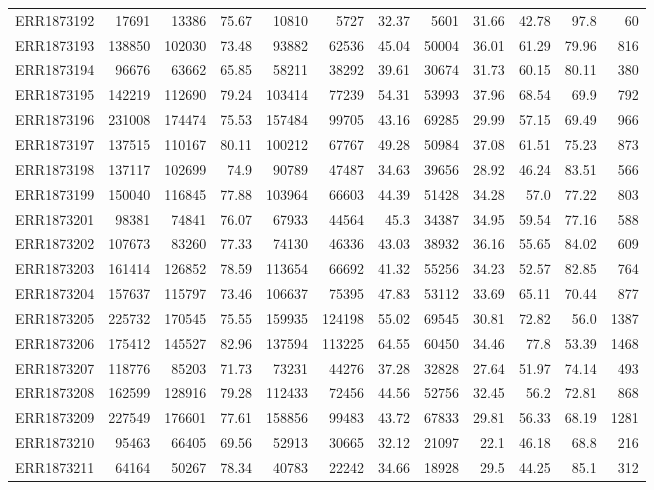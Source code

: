 \documentclass[12pt, oneside]{report}
\begin{document}
\begin{longtable}{@{}p{3.2cm}rrrrrrrrrrr@{}}
ERR1873192 & 17691 & 13386 & 75.67 & 10810 & 5727 & 32.37 & 5601 & 31.66 & 42.78 & 97.8 & 60 \\
ERR1873193 & 138850 & 102030 & 73.48 & 93882 & 62536 & 45.04 & 50004 & 36.01 & 61.29 & 79.96 & 816 \\
ERR1873194 & 96676 & 63662 & 65.85 & 58211 & 38292 & 39.61 & 30674 & 31.73 & 60.15 & 80.11 & 380 \\
ERR1873195 & 142219 & 112690 & 79.24 & 103414 & 77239 & 54.31 & 53993 & 37.96 & 68.54 & 69.9 & 792 \\
ERR1873196 & 231008 & 174474 & 75.53 & 157484 & 99705 & 43.16 & 69285 & 29.99 & 57.15 & 69.49 & 966 \\
ERR1873197 & 137515 & 110167 & 80.11 & 100212 & 67767 & 49.28 & 50984 & 37.08 & 61.51 & 75.23 & 873 \\
ERR1873198 & 137117 & 102699 & 74.9 & 90789 & 47487 & 34.63 & 39656 & 28.92 & 46.24 & 83.51 & 566 \\
ERR1873199 & 150040 & 116845 & 77.88 & 103964 & 66603 & 44.39 & 51428 & 34.28 & 57.0 & 77.22 & 803 \\
ERR1873201 & 98381 & 74841 & 76.07 & 67933 & 44564 & 45.3 & 34387 & 34.95 & 59.54 & 77.16 & 588 \\
ERR1873202 & 107673 & 83260 & 77.33 & 74130 & 46336 & 43.03 & 38932 & 36.16 & 55.65 & 84.02 & 609 \\
ERR1873203 & 161414 & 126852 & 78.59 & 113654 & 66692 & 41.32 & 55256 & 34.23 & 52.57 & 82.85 & 764 \\
ERR1873204 & 157637 & 115797 & 73.46 & 106637 & 75395 & 47.83 & 53112 & 33.69 & 65.11 & 70.44 & 877 \\
ERR1873205 & 225732 & 170545 & 75.55 & 159935 & 124198 & 55.02 & 69545 & 30.81 & 72.82 & 56.0 & 1387 \\
ERR1873206 & 175412 & 145527 & 82.96 & 137594 & 113225 & 64.55 & 60450 & 34.46 & 77.8 & 53.39 & 1468 \\
ERR1873207 & 118776 & 85203 & 71.73 & 73231 & 44276 & 37.28 & 32828 & 27.64 & 51.97 & 74.14 & 493 \\
ERR1873208 & 162599 & 128916 & 79.28 & 112433 & 72456 & 44.56 & 52756 & 32.45 & 56.2 & 72.81 & 868 \\
ERR1873209 & 227549 & 176601 & 77.61 & 158856 & 99483 & 43.72 & 67833 & 29.81 & 56.33 & 68.19 & 1281 \\
ERR1873210 & 95463 & 66405 & 69.56 & 52913 & 30665 & 32.12 & 21097 & 22.1 & 46.18 & 68.8 & 216 \\
ERR1873211 & 64164 & 50267 & 78.34 & 40783 & 22242 & 34.66 & 18928 & 29.5 & 44.25 & 85.1 & 312 \\

\end{longtable}
\end{document}

